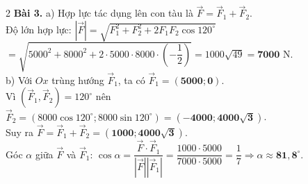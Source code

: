 \documentclass[10pt,a4paper]{article}
\begin{document}
\begin{multicols}{2}
\textbf{Bài 3.}
a) Hợp lực tác dụng lên con tàu là $\vec{F} = \vec{F}_1 + \vec{F}_2$.\\
Độ lớn hợp lực: $|\vec{F}| = \sqrt{F_1^2 + F_2^2 + 2F_1 F_2 \cos 120^\circ}$\\
$= \sqrt{5000^2 + 8000^2 + 2\cdot 5000\cdot 8000\cdot \left(-\dfrac{1}{2}\right)} = 1000\sqrt{49} = \mathbf{7000}\text{ N}$.\\
b) Với $Ox$ trùng hướng $\vec{F}_1$, ta có $\vec{F}_1 = (\mathbf{5000}; \mathbf{0})$.\\
Vì $(\vec{F}_1, \vec{F}_2) = 120^\circ$ nên $\vec{F}_2 = (8000\cos 120^\circ; 8000\sin 120^\circ) = (\mathbf{-4000}; \mathbf{4000\sqrt{3}})$.\\
Suy ra $\vec{F} = \vec{F}_1 + \vec{F}_2 = (\mathbf{1000}; \mathbf{4000\sqrt{3}})$.\\
Góc $\alpha$ giữa $\vec{F}$ và $\vec{F}_1$: $\cos\alpha = \dfrac{\vec{F} \cdot \vec{F}_1}{|\vec{F}||\vec{F}_1|} = \dfrac{1000 \cdot 5000}{7000 \cdot 5000} = \dfrac{1}{7} \Rightarrow \alpha \approx \mathbf{81{,}8}^\circ$.

\end{multicols}
\end{document}
